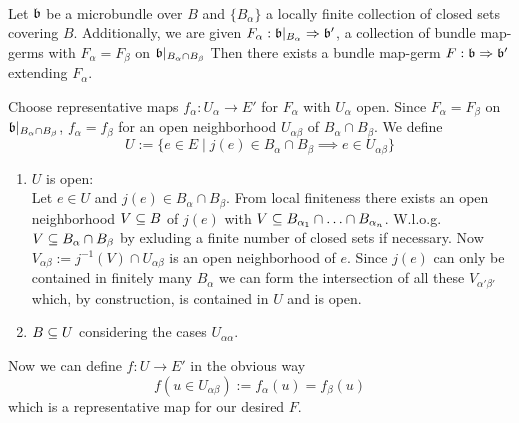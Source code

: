 \\
Let $\mathfrak{b}$ be a microbundle over $B$ and $\{B_\alpha\}$ a locally finite collection of closed sets covering $B$.
Additionally, we are given $F_\alpha: \mathfrak{b}\vert_{B_\alpha} \Rightarrow \mathfrak{b}'$, a collection of bundle map-germs with
$F_\alpha = F_\beta$ on $\mathfrak{b}\vert_{B_\alpha \cap B_\beta}$
Then there exists a bundle map-germ $F: \mathfrak{b} \Rightarrow \mathfrak{b}'$ extending $F_\alpha$.
\begin{myproof}
Choose representative maps $f_\alpha: U_\alpha \to E'$ for $F_\alpha$ with $U_\alpha$ open.
Since $F_\alpha = F_\beta$ on $\mathfrak{b}\vert_{B_\alpha \cap B_\beta}$, $f_\alpha = f_\beta$ for an open neighborhood $U_{\alpha\beta}$ of $B_\alpha \cap B_\beta$.
We define
\[ U := \{ e \in E \mid j(e) \in B_\alpha \cap B_\beta \implies e \in U_{\alpha\beta} \}\]
\begin{enumerate}
    \item $U$ is open: \\
    Let $e \in U$ and $j(e) \in B_\alpha \cap B_\beta$.
    From local finiteness there exists an open neighborhood $V \subseteq{} B$ of $j(e)$ with $V \subseteq{} B_{\alpha_1} \cap \ldots \cap B_{\alpha_n}$.
    W.l.o.g. $V \subseteq{} B_\alpha \cap B_\beta$ by exluding a finite number of closed sets if necessary.
    Now $V_{\alpha\beta} := j^{-1}(V) \cap U_{\alpha\beta}$ is an open neighborhood of $e$.
    Since $j(e)$ can only be contained in finitely many $B_\alpha$ we can form the intersection of all these $V_{\alpha'\beta'}$
    which, by construction, is contained in $U$ and is open.
    \item $B \subseteq{} U$ considering the cases $U_{\alpha\alpha}$.
\end{enumerate}

Now we can define $f: U \to E'$ in the obvious way
\[ f(u \in U_{\alpha\beta}) := f_\alpha(u) = f_\beta(u) \]
which is a representative map for our desired $F$.
\end{myproof}